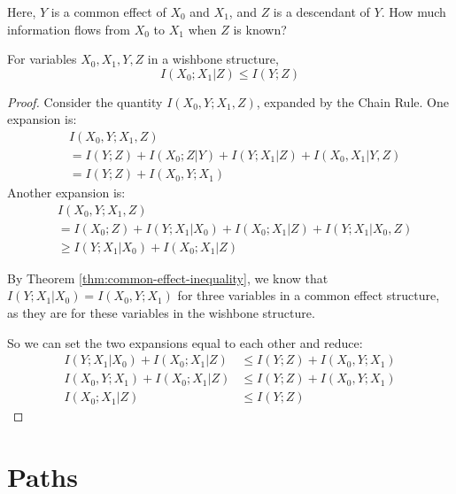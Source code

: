 \documentclass[../thesis.tex]{subfiles}
\begin{document}
Here, $Y$ is a common effect of $X_0$ and $X_1$,
and $Z$ is a descendant of $Y$.
How much information flows from $X_0$ to $X_1$
when $Z$ is known?

\begin{thm}
  \label{thm:wishbone}
  For variables $X_0, X_1, Y, Z$ in a wishbone structure,
  $$I(X_0;X_1 \vert Z) \leq I(Y;Z)$$
\end{thm}
\begin{proof}
  Consider the quantity $I(X_0, Y; X_1, Z)$,
  expanded by the Chain Rule.
  One expansion is:
  \begin{equation}
    \begin{split}
      & I(X_0, Y; X_1, Z) \\
      & = I(Y;Z) + I(X_0;Z \vert Y) + I(Y; X_1 \vert Z) + I(X_0, X_1 \vert Y,Z) \\
      & = I(Y;Z) + I(X_0,Y;X_1)
    \end{split}
  \end{equation}
  Another expansion is:
  \begin{equation}
    \begin{split}
      & I(X_0, Y; X_1, Z) \\
      & = I(X_0;Z) + I(Y;X_1 \vert X_0) +
      I(X_0; X_1 \vert Z) + I(Y; X_1 \vert X_0,Z) \\
      & \geq I(Y; X_1 \vert X_0) + I(X_0; X_1 \vert Z) 
    \end{split}
  \end{equation}

  By Theorem \ref{thm:common-effect-inequality},
  we know that $I(Y;X_1 \vert X_0) = I(X_0,Y;X_1)$
  for three variables in a common effect structure,
  as they are for these variables in the wishbone structure.

  So we can set the two expansions equal to each other and reduce:
  \begin{equation}
    \begin{split}
      I(Y; X_1 \vert X_0) + I(X_0; X_1 \vert Z) & \leq I(Y;Z) + I(X_0,Y;X_1) \\
      I(X_0, Y; X_1) + I(X_0; X_1 \vert Z) & \leq I(Y;Z) + I(X_0,Y;X_1) \\
      I(X_0; X_1 \vert Z) & \leq I(Y;Z)
    \end{split}
  \end{equation}
\end{proof}

\section{Paths}
\end{document}
